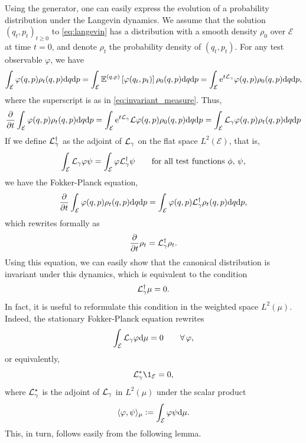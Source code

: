     Using the generator, one can easily express the evolution of a probability distribution under the Langevin dynamics.
    We assume that the solution $(q_t,p_t)_{t\geq 0}$ to \eqref{eq:langevin} has a distribution with a smooth density $\rho_0$ over $\mathcal E$ at time $t=0$, and denote $\rho_t$ the probability density of $(q_t,p_t)$.
    For any test observable $\varphi$, we have
    $$\int_{\mathcal E}\varphi(q,p)\rho_t(q,p)\mathrm{d} q\mathrm{d} p=\int_{\mathcal E}\mathbb{E}^{(q,p)}\left[\varphi(q_t,p_t)\right]\rho_0(q,p)\mathrm{d} q\mathrm{d} p=\int_{\mathcal E}\mathrm{e}^{t\mathcal{L}_\gamma}\varphi(q,p)\rho_0(q,p)\mathrm{d} q\mathrm{d} p,$$
    where the superscript is as in \eqref{eq:invariant_measure}. Thus,
    $$\frac{\partial}{\partial t}\int_{\mathcal E}\varphi(q,p)\rho_t(q,p)\mathrm{d} q\mathrm{d} p=\int_{\mathcal E}\mathrm{e}^{t\mathcal{L}_\gamma}\mathcal{L}\varphi(q,p)\rho_0(q,p)\mathrm{d} q\mathrm{d} p=\int_{\mathcal E}\mathcal{L}_\gamma\varphi(q,p)\rho_t(q,p)\mathrm{d} q \mathrm{d} p$$
    If we define $\mathcal{L}_\gamma^\dagger$ as the adjoint of $\mathcal{L}_\gamma$ on the flat space $L^2(\mathcal E)$, that is,
    \begin{equation}
        \label{eq:L_dagger}
        \int_{\mathcal E}\mathcal{L}_\gamma\varphi \psi=\int_{\mathcal E}\varphi \mathcal{L}_\gamma^\dagger \psi \qquad\text{for all test functions }\phi,\,\psi,
    \end{equation}
    we have the Fokker-Planck equation,
    \begin{equation}\label{eq:fokker_planck}
        \frac{\partial}{\partial t}\int_{\mathcal E}\varphi(q,p)\rho_t(q,p)\mathrm{d} q\mathrm{d} p=\int_{\mathcal E}\varphi(q,p)\mathcal{L}_\gamma^\dagger\rho_t(q,p)\mathrm{d} q \mathrm{d} p,
    \end{equation}
    which rewrites formally as 
    \begin{equation}
        \label{eq:fokker_planck_formal}
        \frac{\partial}{\partial t}\rho_t=\mathcal{L}_\gamma^\dagger\rho_t.
    \end{equation}
    Using this equation, we can easily show that the canonical distribution is invariant under this dynamics, which is equivalent to the condition 
    $$\mathcal{L}_\gamma^\dagger \mu=0.$$
    In fact, it is useful to reformulate this condition in the weighted space $L^{2}(\mu)$. Indeed, the stationary Fokker-Planck equation rewrites
    $$\int_{\mathcal E}\mathcal{L}_\gamma \varphi \mathrm{d} \mu=0\qquad \forall\,\varphi,$$
    or equivalently,
    $$\cL_\gamma^* \1_{\mathcal E}=0,$$
    where $\mathcal{L}_\gamma^*$ is the adjoint of $\mathcal{L}_\gamma$ in $L^2(\mu)$ under the scalar product
    $$\langle \varphi,\psi \rangle_\mu\mathrel{\mathop:}= \int_{\mathcal E}\varphi \psi \mathrm{d} \mu.$$
    This, in turn, follows easily from the following lemma.
